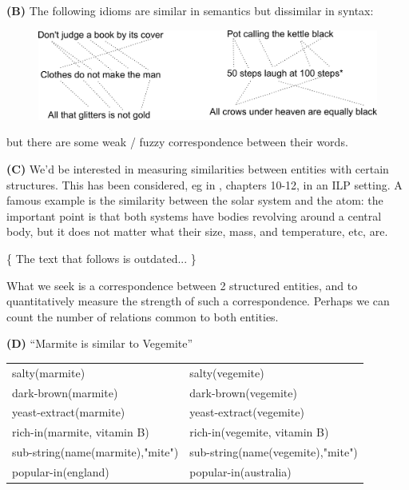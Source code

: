\textbf{(B)} The following idioms are similar in semantics but dissimilar in syntax:
\begin{figure}[H]
\centering
\includegraphics[scale=0.8]{similar-idioms.png}
\end{figure}
\vspace{-1em}
\renewcommand{\thefootnote}{\fnsymbol{footnote}}
\renewcommand{\thefootnote}{\arabic{footnote}}
but there are some weak / fuzzy correspondence between their words.  

\textbf{(C)} We'd be interested in measuring similarities between entities with certain structures.  This has been considered, eg in \citep*{Schmid2003}, chapters 10-12, in an ILP setting.  A famous example is the similarity between the solar system and the atom:  the important point is that both systems have bodies revolving around a central body, but it does not matter what their size, mass, and temperature, etc, are.

\{ The text that follows is outdated... \}
\underconst

What we seek is a correspondence between 2 structured entities, and to quantitatively measure the strength of such a correspondence.  Perhaps we can count the number of relations common to both entities.

\textbf{(D)} ``Marmite is similar to Vegemite''\\
\hspace*{1cm} \begin{tabular}{l|l}
salty(marmite)                   & salty(vegemite)\\
dark-brown(marmite)              & dark-brown(vegemite)\\
yeast-extract(marmite)           & yeast-extract(vegemite)\\
rich-in(marmite, vitamin B)      & rich-in(vegemite, vitamin B)\\
sub-string(name(marmite),"mite") & sub-string(name(vegemite),"mite")\\
popular-in(england)              & popular-in(australia)
\end{tabular}

